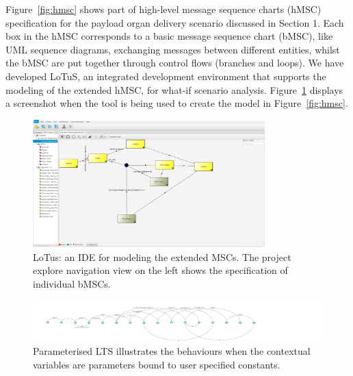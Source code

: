 Figure~\ref{fig:hmsc} shows part of high-level message sequence charts (hMSC) specification for the payload organ delivery scenario discussed in Section 1. Each box in the hMSC corresponds to a basic message sequence chart (bMSC), like UML sequence diagrams, exchanging messages between different entities, whilst the bMSC are put together through control flows (branches and loops). 
We have developed LoTuS, an integrated development environment that supports the modeling of the extended hMSC, for what-if scenario analysis.
Figure~\ref{fig:lotus} displays a screenshot when the tool is being used to create the model in Figure~\ref{fig:hmsc}.
\begin{figure}
 \includegraphics[width=0.8\textwidth]{figures/2-LoTuS.png}
    \caption{LoTus: an IDE for modeling the extended MSCs. The project explore navigation view on the left shows the specification of individual bMSCs. }
    \label{fig:lotus}
    \vspace*{-0.25cm}
\end{figure}

\begin{figure}
 \includegraphics[width=\textwidth]{figures/3-parameterized-LTS.png}
    \caption{Parameterised LTS illustrates the behaviours when the contextual variables are parameters bound to user specified constants. }
    \label{fig:pLTS}
    \vspace*{-0.25cm}
\end{figure}

